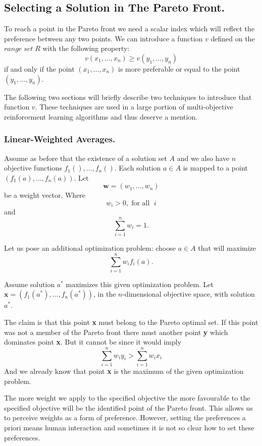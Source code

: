 \subsection{Selecting a Solution in The Pareto Front.}
\label{sec:Selecting-a-solution-in-the-Pareto-Front}
To reach a point in the Pareto front we need a scalar index which will reflect the preference between any two points. We can introduce a function $v$ defined on the $range \;set\; R$ with the following property:
$$ v(x_{1},..., x_{n}) \geq v(y_{1},..., y_{n}) $$
if and only if the point $ (x_{1},..., x_{n}) $ is more preferable or equal to the point $ (y_{1},..., y_{n}) $.

The following two sections will briefly describe two techniques to introduce that function $v$. These techniques are used in a large portion of multi-objective reinforcement learning algorithms and thus deserve a mention.

\subsubsection{Linear-Weighted Averages.}
Assume as before that the existence of a solution set $A$ and we also have $n$ objective functions $ f_{1}(),...,f_{n}() $. Each solution $ a\in A $ is mapped to a point $ (f_{1}(a),...,f_{n}(a)) $. Let
$$ \textbf{w} = (w_{1},...,w_{n}) $$
be a weight vector. Where
$$ w_{i} > 0, \;\text{for all }\; i $$
and
$$ \displaystyle\sum_{i=1}^{n} w_{i} = 1. $$

Let us pose an additional optimization problem: choose $a \in A$ that will maximize
$$ \displaystyle\sum_{i=1}^{n} w_{i}f_{i}(a). $$

Assume solution $a^{*}$ maximizes this given optimization problem. Let $ \textbf{x} = (f_{1}(a^{*}),...,f_{n}(a^{*})) $, in the $n$-dimensional objective space, with solution $a^{*}$.

The claim is that this point \textbf{x} must belong to the Pareto optimal set. If this point was not a member of the Pareto front there must another point \textbf{y} which dominates point \textbf{x}. But it cannot be since it would imply
$$ \displaystyle\sum_{i=1}^{n} w_{i}y_{i} > \displaystyle\sum_{i=1}^{n} w_{i}x_{i} $$
And we already know that point \textbf{x} is the maximum of the given optimization problem.

The more weight we apply to the specified objective the more favourable to the specified objective will be the identified point of the Pareto front. This allows us to perceive weights as a form of preference. However, setting the preferences a priori means human interaction and sometimes it is not so clear how to set these preferences.

